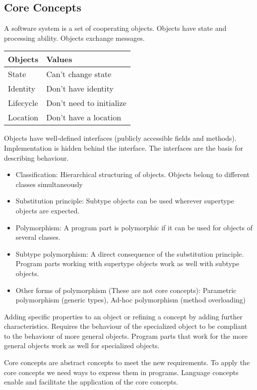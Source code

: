 \subsection{Core Concepts}
\begin{mytitle} A software system is a set of cooperating objects. Objects have state and processing ability. Objects exchange messages.
\begin{center}
    \begin{tabular}{R{0.4\textwidth}|L{0.4\textwidth}}
        Objects & Values \\
        \hline
        State & Can't change state\\
        Identity & Don't have identity\\
        Lifecycle & Don't need to initialize\\
        Location & Don't have a location
    \end{tabular}
\end{center}
\end{mytitle}
\begin{mytitle} Objects have well-defined interfaces (publicly accessible fields and methods). Implementation is hidden behind the interface. The interfaces are the basis for describing behaviour.
\end{mytitle}
\begin{mytitle}\hfill
\begin{itemize}
    \item Classification: Hierarchical structuring of objects. Objects belong to different classes simultaneously
    \item Substitution principle: Subtype objects can be used wherever supertype objects are expected.
    \item Polymorphism: A program part is polymorphic if it can be used for objects of several classes.
    \item Subtype polymorphism: A direct consequence of the substitution principle. Program parts working with supertype objects work as well with subtype objects.
    \item Other forms of polymorphism (These are not core concepts): Parametric polymorphism (generic types), Ad-hoc polymorphism (method overloading)
\end{itemize}
\end{mytitle}
\begin{mytitle}[Specialization] Adding specific properties to an object or refining a concept by adding further characteristics. Requires the behaviour of the specialized object to be compliant to the behaviour of more general objects. Program parts that work for the more general objects work as well for specialized objects.
\end{mytitle}
\begin{mytitle}[Summary] Core concepts are abstract concepts to meet the new requirements. To apply the core concepts we need ways to express them in programs. Language concepts enable and facilitate the application of the core concepts.
\end{mytitle}

